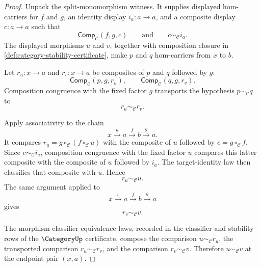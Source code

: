 \begin{proof}
Unpack the split-monomorphism witness. It supplies displayed hom-carriers for
$f$ and $g$, an identity display $i_a:a\to a$, and a composite display
$c:a\to a$ such that
$$
\mathsf{Comp}_{\mathcal C}(f,g,c)
\qquad\text{and}\qquad
c\sim_{\mathcal C} i_a.
$$
The displayed morphisms $u$ and $v$, together with composition closure in
\autoref{def:category-stability-certificate}, make $p$ and $q$ hom-carriers
from $x$ to $b$.

Let $r_u:x\to a$ and $r_v:x\to a$ be composites of $p$ and $q$ followed by
$g$:
$$
\mathsf{Comp}_{\mathcal C}(p,g,r_u),
\qquad
\mathsf{Comp}_{\mathcal C}(q,g,r_v).
$$
Composition congruence with the fixed factor $g$ transports the hypothesis
$p\sim_{\mathcal C}q$ to
$$
r_u\sim_{\mathcal C} r_v.
$$

Apply associativity to the chain
$$
x\xrightarrow{u}a\xrightarrow{f}b\xrightarrow{g}a.
$$
It compares $r_u=g\circ_{\mathcal C}(f\circ_{\mathcal C}u)$ with the
composite of $u$ followed by $c=g\circ_{\mathcal C}f$. Since
$c\sim_{\mathcal C}i_a$, composition congruence with the fixed factor $u$
compares this latter composite with the composite of $u$ followed by $i_a$.
The target-identity law then classifies that composite with $u$. Hence
$$
r_u\sim_{\mathcal C}u.
$$
The same argument applied to
$$
x\xrightarrow{v}a\xrightarrow{f}b\xrightarrow{g}a
$$
gives
$$
r_v\sim_{\mathcal C}v.
$$

The morphism-classifier equivalence laws, recorded in the classifier and
stability rows of the $\CategoryUp$ certificate, compose the comparison
$u\sim_{\mathcal C}r_u$, the transported comparison
$r_u\sim_{\mathcal C}r_v$, and the comparison $r_v\sim_{\mathcal C}v$.
Therefore $u\sim_{\mathcal C}v$ at the endpoint pair $(x,a)$.
\end{proof}
